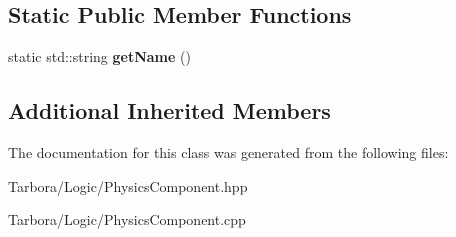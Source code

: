 \subsection*{Static Public Member Functions}
\begin{DoxyCompactItemize}
\item 
\mbox{\label{classTarbora_1_1PhysicsSystem_a58892489b0127fb0948ecae955477724}} 
static std\+::string {\bfseries get\+Name} ()
\end{DoxyCompactItemize}
\subsection*{Additional Inherited Members}


The documentation for this class was generated from the following files\+:\begin{DoxyCompactItemize}
\item 
Tarbora/\+Logic/Physics\+Component.\+hpp\item 
Tarbora/\+Logic/Physics\+Component.\+cpp\end{DoxyCompactItemize}
